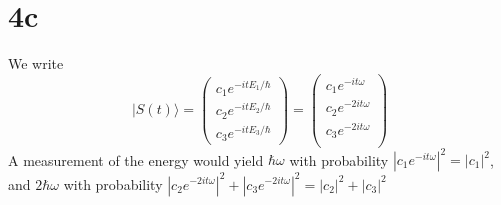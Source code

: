 \documentclass{article}
\begin{document}
\section*{4c}
We write
\[
  |S(t)\rangle=
  \begin{pmatrix}
    c_{1}e^{-itE_{1}/\hbar} \\
    c_{2}e^{-itE_{2}/\hbar} \\
    c_{3}e^{-itE_{3}/\hbar}
  \end{pmatrix}
  =
  \begin{pmatrix}
    c_{1}e^{-it\omega} \\
    c_{2}e^{-2it\omega} \\
    c_{3}e^{-2it\omega} \\
  \end{pmatrix}
\]
A measurement of the energy would yield $\hbar\omega$ with probability $|c_{1}e^{-it\omega}|^{2}=|c_{1}|^{2}$,
and $2\hbar\omega$ with probability $|c_{2}e^{-2it\omega}|^{2}+|c_{3}e^{-2it\omega}|^{2}=|c_{2}|^{2}+|c_{3}|^{2}$
\end{document}
